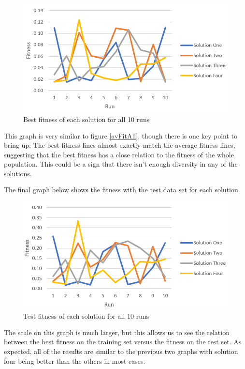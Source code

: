 \documentclass[sigconf]{acmart}
\begin{document}
\begin{figure}[H]
\includegraphics[width=\columnwidth]{bestFitnessAll.png}
\caption[width=\columnwidth]{Best fitness of each solution for all 10 runs} \label{bestFitAll}
\end{figure}

This graph is very similar to figure \ref{avFitAll}, though there is one key point to bring up: The best fitness lines almost exactly match the average fitness lines, suggesting that the best fitness has a close relation to the fitness of the whole population. This could be a sign that there isn't enough diversity in any of the solutions.

The final graph below shows the fitness with the test data set for each solution.

\begin{figure}[H]
\includegraphics[width=\columnwidth]{testFitnessAll.png}
\caption[width=\columnwidth]{Test fitness of each solution for all 10 runs} \label{bestFitAll}
\end{figure}

The scale on this graph is much larger, but this allows us to see the relation between the best fitness on the training set versus the fitness on the test set. As expected, all of the results are similar to the previous two graphs with solution four being better than the others in most cases.
\end{document}

